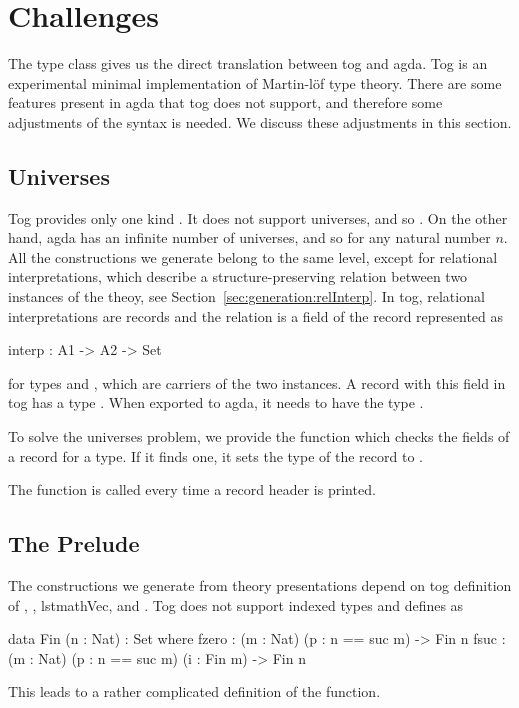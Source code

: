 \section{Challenges}
\label{sec:exporting:challenges}
The  type class gives us the direct translation between tog and agda. Tog is an experimental minimal implementation of Martin-l\"{o}f type theory. There are some features present in agda that tog does not support, and therefore some adjustments of the syntax is needed. We discuss these adjustments in this section. 

\subsection{Universes}
Tog provides only one kind . It does not support universes, and so . On the other hand, agda has an infinite number of universes, and so 
 for any natural number $n$. 
All the constructions we generate belong to the same level, except for relational interpretations, which describe a structure-preserving relation between two instances of the theoy, see Section~\ref{sec:generation:relInterp}. In tog, relational interpretations are records and the relation is a field of the record represented as 
\begin{togcode}
interp : A1 -> A2 -> Set
\end{togcode}
for types  and , which are carriers of the two instances. 
A record with this field in tog has a type . When exported to agda, it needs to have the type . 

To solve the universes problem, we provide the function  which checks the fields of a record for a  type. If it finds one, it sets the type of the record to . 
The function  is called every time a record header is printed. 

\subsection{The Prelude}
The constructions we generate from theory presentations depend on tog definition of , , lstmath{Vec}, and . Tog does not support indexed types and defines  as  
\begin{togcode}
data Fin (n : Nat) : Set where
  fzero : (m : Nat) (p : n == suc m) -> Fin n
  fsuc  : (m : Nat) (p : n == suc m) (i : Fin m) -> Fin n
\end{togcode}
This leads to a rather complicated definition of the  function. 

